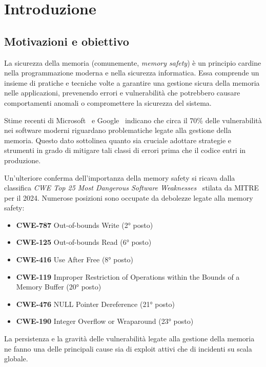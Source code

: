 \chapter{Introduzione}
\label{cha:introduction}

\section*{Motivazioni e obiettivo}
\label{sec:motivation} La sicurezza della memoria (comunemente, \textit{memory
safety}) è un principio cardine nella programmazione moderna e nella sicurezza
informatica. Essa comprende un insieme di pratiche e tecniche volte a garantire una
gestione sicura della memoria nelle applicazioni, prevenendo errori e
vulnerabilità che potrebbero causare comportamenti anomali o compromettere la
sicurezza del sistema.

Stime recenti di Microsoft~\cite{microsoft_proactive_approach} e Google~\cite{chromium_memory_safety}
indicano che circa il 70\% delle vulnerabilità nei software moderni riguardano problematiche
legate alla gestione della memoria. Questo dato sottolinea quanto sia cruciale
adottare strategie e strumenti in grado di mitigare tali classi di errori prima
che il codice entri in produzione.

Un'ulteriore conferma dell'importanza della memory safety si ricava dalla
classifica \textit{CWE Top 25 Most Dangerous Software Weaknesses}~\cite{cwe_top25_2024}
stilata da MITRE per il 2024. Numerose posizioni sono occupate da debolezze legate
alla memory safety:
\begin{itemize}
  \item \textbf{CWE-787} Out-of-bounds Write (2° posto)

  \item \textbf{CWE-125} Out-of-bounds Read (6° posto)

  \item \textbf{CWE-416} Use After Free (8° posto)

  \item \textbf{CWE-119} Improper Restriction of Operations within the Bounds of
    a Memory Buffer (20° posto)

  \item \textbf{CWE-476} NULL Pointer Dereference (21° posto)

  \item \textbf{CWE-190} Integer Overflow or Wraparound (23° posto)
\end{itemize}
La persistenza e la gravità delle vulnerabilità legate alla gestione della
memoria ne fanno una delle principali cause sia di exploit attivi che di
incidenti su scala globale.

